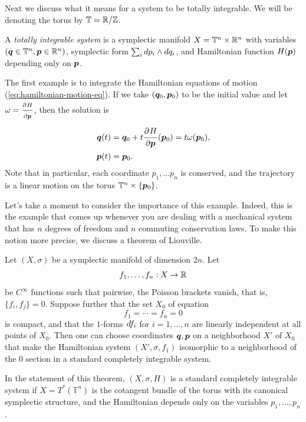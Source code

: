 \documentclass[twoside,letterpaper,11pt]{article}
\numberwithin{equation}{section}
\newcommand{\T}{\mathbb{T}}
\begin{document}
Next we discuss what it means for a system to be totally integrable.
We will be denoting the torus by $\T = \R / \Z$.
\begin{defn}
  A \emph{totally integrable system} is a symplectic manifold $X = \T^n \times
  \R^n$ with variables $(\bp{q} \in \T^n, \bp{p} \in \R^n)$, symplectic form
  $\sum_i \mathop{}\!d p_i \wedge \mathop{}\!d q_i$, and Hamiltonian function $H(\bm{p})$
  depending only on $\bm{p}$.
\end{defn}
The first example is to integrate the Hamiltonian equations of motion
(\cref{eq:hamiltonian-motion-eq}).
If we take $(\bm{q}_0, \bm{p}_0)$ to be the initial value and let $\omega =
\frac{\strut\partial^{}H}{\strut\partial\bm{p}^{}}$, then the solution is 
\begin{align*}
  \bm{q}(t) &= \bm{q}_0 + t \frac{\strut\partial^{}H}{\strut\partial\bm{p}^{}}(\bm{p}_0) = t \omega(\bm{p}_0),\\
  \bm{p}(t) &= \bm{p}_0.
\end{align*}
Note that in particular, each coordinate $p_1, \ldots p_n$ is conserved, and the
trajectory is a linear motion on the torus $\T^n \times \{\bp{p}_0\}$.

Let's take a moment to consider the importance of this example.
Indeed, this is the example that comes up whenever you are dealing with a
mechanical system that has $n$ degrees of freedom and $n$ commuting conservation
laws.
To make this notion more precise, we discuss a theorem of Liouville.
\begin{thm}
  Let $(X, \sigma)$ be a symplectic manifold of dimension $2n$.
  Let
  \begin{equation*}
    f_1, \ldots, f_n : X \to \mathbb{R}
  \end{equation*}
  be $C^{\infty}$ functions such that pairwise, the Poisson brackets vanish,
  that is, $\{f_i, f_j\} = 0$.
  Suppose further that the set $X_0$ of equation
  \begin{equation*}
    f_1 = \cdots = f_n = 0
  \end{equation*}
  is compact, and that the $1$-forms $\mathop{}\!d f_i$ for $i = 1, \ldots, n$ are
  linearly independent at all points of $X_0$.
  Then one can choose coordinates $\bm{q}, \bm{p}$ on a neighborhood $X'$ of
  $X_0$ that make the Hamiltonian system $(X', \sigma, f_1)$ isomorphic to a
  neighborhood of the $0$ section in a standard completely integrable system.
\end{thm}
In the statement of this theorem, $(X, \sigma, H)$ is a standard completely
integrable system if $X = T^*(\T^n)$ is the cotangent bundle of the torus with
its canonical symplectic structure, and the Hamiltonian depends only on the
variables $p_1, \ldots, p_n$.
\end{document}
